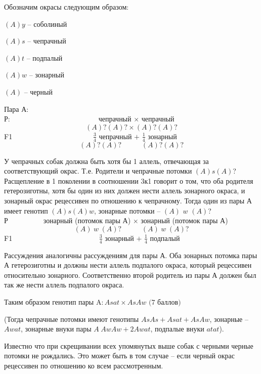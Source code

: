 \solutionSection
Обозначим окрасы следующим образом:

$(A)y$ – соболиный

$(A)s$ – чепрачный

$(A)t$ – подпалый

$(A)w$ – зонарный

$(A)$ – черный

Пара А:\\
Р:$\hspace{150pt}$чепрачный $\times$ чепрачный
$$(A)?(A)?\times(A)?(A)?$$
F1$\hspace{137pt}\frac{3}{4}$ чепрачный $+$ $\frac{1}{4}$ зонарный
$$(A)?(A)?\hspace{34pt}(A)?(A)?$$

У чепрачных собак должна быть хотя бы  1 аллель, отвечающая за соответствующий окрас. Т.е. Родители и чепрачные потомки $(A)s(A)$? Расщепление в  1 поколении в соотношении 3к1 говорит о том, что оба родителя гетерозиготны, хотя бы один из них должен нести аллель зонарного окраса, и зонарный окрас рецессивен по отношению к чепрачному. Тогда один из пары А имеет генотип $(A)s(A)w$, зонарные потомки – $(A)$ $w$ $(A)$?\\
Р$\hspace{60pt}$зонарный (потомок пары А) $\times$ зонарный (потомок пары А) 
$$(A)\hspace{3pt}w\hspace{3pt}(A)?\hspace{34pt}(A)\hspace{3pt}w\hspace{3pt}(A)?$$
F1$\hspace{147pt}\frac{3}{4}$ зонарный $+$ $\frac{1}{4}$ подпалый

Рассуждения аналогичны рассуждениям для пары А. Оба зонарных потомка пары А гетерозиготны и  должны нести аллель подпалого окраса, который рецессивен относительно зонарного. Соответственно второй родитель из пары А должен был так же нести аллель подпалого окраса.

Таким образом генотип пары A$: Asat \times AsAw$ $\textit{(7 баллов)}$

(Тогда чепрачные потомки имеют генотипы $AsAs + Asat + AsAw$, зонарные – $Awat$, зонарные внуки пары $A\hspace{3pt}AwAw +2 Awat$, подпалые внуки $atat$).

Известно что при скрещивании всех упомянутых выше собак с черными черные потомки не рождались. Это может быть в том случае – если черный окрас рецессивен по отношению ко всем рассмотренным.

